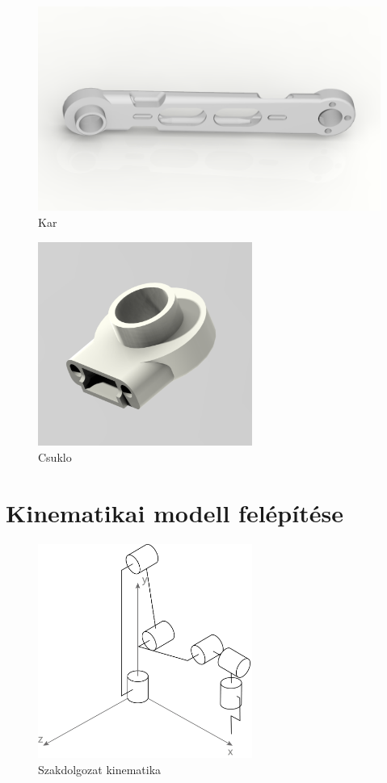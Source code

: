 \begin{figure}[!ht]
\centering
\includegraphics[width=150mm, keepaspectratio]{figures/Diploma_CAD/creo3.png}
\caption{Kar}
\label{fig:kar}
\end{figure}


\begin{figure}[!ht]
\centering
\includegraphics[width=70mm, keepaspectratio]{figures/Diploma_CAD/creo4.png}
\caption{Csuklo}
\label{fig:Csuklo}
\end{figure}


\section{Kinematikai modell felépítése}

\begin{figure}[!ht]
\centering
\includegraphics[width=70mm, keepaspectratio]{figures/Szakdoga/kinematik_v_2}
\caption{Szakdolgozat kinematika}
\label{fig:Csuklo}
\end{figure}

